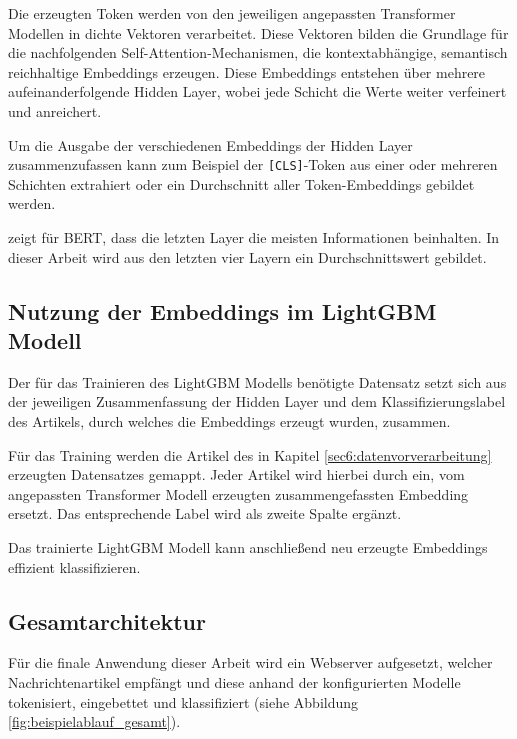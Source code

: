 Die erzeugten Token werden von den jeweiligen angepassten Transformer Modellen in dichte Vektoren verarbeitet.
Diese Vektoren bilden die Grundlage für die nachfolgenden Self-Attention-Mechanismen, die kontextabhängige, semantisch reichhaltige Embeddings erzeugen.
Diese Embeddings entstehen über mehrere aufeinanderfolgende Hidden Layer, wobei jede Schicht die Werte weiter verfeinert und anreichert.

Um die Ausgabe der verschiedenen Embeddings der Hidden Layer zusammenzufassen kann zum Beispiel der \texttt{[CLS]}-Token aus einer oder mehreren Schichten extrahiert oder 
ein Durchschnitt aller Token-Embeddings gebildet werden.

\cite{sun2020finetuneberttextclassification} zeigt für BERT, dass die letzten Layer die meisten Informationen beinhalten.
In dieser Arbeit wird aus den letzten vier Layern ein Durchschnittswert gebildet.

\subsection{Nutzung der Embeddings im LightGBM Modell}

Der für das Trainieren des LightGBM Modells benötigte Datensatz setzt sich aus der jeweiligen Zusammenfassung der Hidden Layer und dem Klassifizierungslabel 
des Artikels, durch welches die Embeddings erzeugt wurden, zusammen. 

Für das Training werden die Artikel des in Kapitel \ref{sec6:datenvorverarbeitung} erzeugten Datensatzes gemappt. 
Jeder Artikel wird hierbei durch ein, vom angepassten Transformer Modell erzeugten zusammengefassten Embedding ersetzt.
Das entsprechende Label wird als zweite Spalte ergänzt.

Das trainierte LightGBM Modell kann anschließend neu erzeugte Embeddings effizient klassifizieren.

\subsection{Gesamtarchitektur}

Für die finale Anwendung dieser Arbeit wird ein Webserver aufgesetzt, welcher Nachrichtenartikel empfängt und diese anhand der konfigurierten Modelle tokenisiert, eingebettet und
klassifiziert (siehe Abbildung \ref{fig:beispielablauf_gesamt}).

